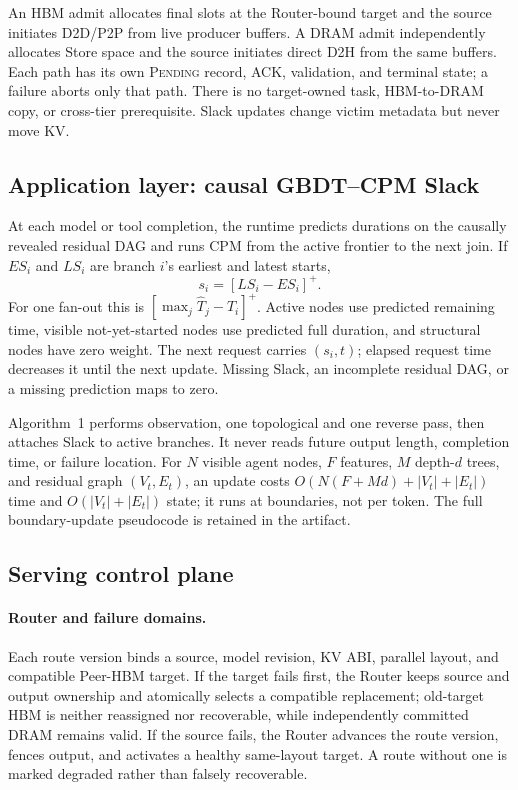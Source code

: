 An HBM admit allocates final slots at the Router-bound target and the source
initiates D2D/P2P from live producer buffers.  A DRAM admit independently
allocates Store space and the source initiates direct D2H from the same
buffers.  Each path has its own \textsc{Pending} record, ACK, validation, and
terminal state; a failure aborts only that path.  There is no target-owned
task, HBM-to-DRAM copy, or cross-tier prerequisite.  Slack updates change
victim metadata but never move KV.

\subsection{Application layer: causal GBDT--CPM Slack}
\label{sec:application-layer}

At each model or tool completion, the runtime predicts durations on the
causally revealed residual DAG and runs CPM from the active frontier to the
next join.  If $ES_i$ and $LS_i$ are branch $i$'s earliest and latest starts,
\begin{equation}
 s_i=[LS_i-ES_i]^+.
 \label{eq:design-slack}
\end{equation}
For one fan-out this is
$[\max_j\widehat T_j-\widehat T_i]^+$.  Active nodes use predicted remaining
time, visible not-yet-started nodes use predicted full duration, and structural
nodes have zero weight.  The next request carries $(s_i,t)$; elapsed request
time decreases it until the next update.  Missing Slack, an incomplete
residual DAG, or a missing prediction maps to zero.

Algorithm~1 performs observation, one topological and one
reverse pass, then attaches Slack to active branches.  It never reads future
output length, completion time, or failure location.  For $N$ visible agent
nodes, $F$ features, $M$ depth-$d$ trees, and residual graph $(V_t,E_t)$, an
update costs $O(N(F+Md)+|V_t|+|E_t|)$ time and
$O(|V_t|+|E_t|)$ state; it runs at boundaries, not per token.  The full
boundary-update pseudocode is retained in the artifact.

\subsection{Serving control plane}
\label{sec:control-plane}

\paragraph{Router and failure domains.}
Each route version binds a source, model revision, KV ABI, parallel layout,
and compatible Peer-HBM target.  If the target fails first, the Router keeps
source and output ownership and atomically selects a compatible replacement;
old-target HBM is neither reassigned nor recoverable, while independently
committed DRAM remains valid.  If the source fails, the Router advances the
route version, fences output, and activates a healthy same-layout target.  A
route without one is marked degraded rather than falsely recoverable.

